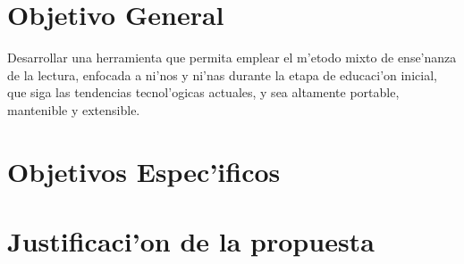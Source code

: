 \section{Objetivo General}

Desarrollar una herramienta que permita {\color{red}emplear} el m'etodo mixto de ense'nanza de la lectura, enfocada a ni'nos y ni'nas durante la etapa de educaci'on inicial, que siga las tendencias
tecnol'ogicas actuales, y sea altamente portable, mantenible y extensible. 


\section{Objetivos Espec'ificos}


\section{Justificaci'on de la propuesta}



